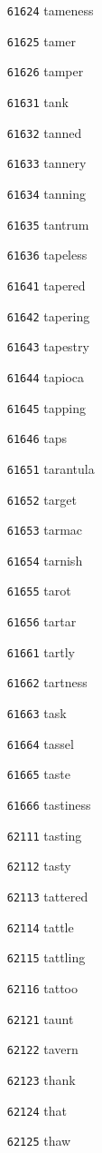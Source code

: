 \documentclass[twoside,11pt]{article}
\begin{document}
\begin{multicols}{5}
\begin{enumerate}
\item[\texttt{61624}] tameness
\item[\texttt{61625}] tamer
\item[\texttt{61626}] tamper
\item[\texttt{61631}] tank
\item[\texttt{61632}] tanned
\item[\texttt{61633}] tannery
\item[\texttt{61634}] tanning
\item[\texttt{61635}] tantrum
\item[\texttt{61636}] tapeless
\item[\texttt{61641}] tapered
\item[\texttt{61642}] tapering
\item[\texttt{61643}] tapestry
\item[\texttt{61644}] tapioca
\item[\texttt{61645}] tapping
\item[\texttt{61646}] taps
\item[\texttt{61651}] tarantula
\item[\texttt{61652}] target
\item[\texttt{61653}] tarmac
\item[\texttt{61654}] tarnish
\item[\texttt{61655}] tarot
\item[\texttt{61656}] tartar
\item[\texttt{61661}] tartly
\item[\texttt{61662}] tartness
\item[\texttt{61663}] task
\item[\texttt{61664}] tassel
\item[\texttt{61665}] taste
\item[\texttt{61666}] tastiness
\item[\texttt{62111}] tasting
\item[\texttt{62112}] tasty
\item[\texttt{62113}] tattered
\item[\texttt{62114}] tattle
\item[\texttt{62115}] tattling
\item[\texttt{62116}] tattoo
\item[\texttt{62121}] taunt
\item[\texttt{62122}] tavern
\item[\texttt{62123}] thank
\item[\texttt{62124}] that
\item[\texttt{62125}] thaw

\end{enumerate}
\end{multicols}
\end{document}
